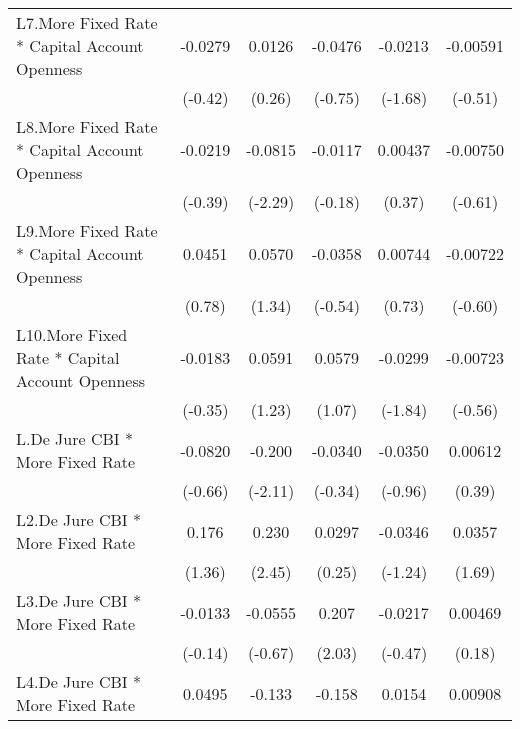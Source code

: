 {\begin{longtable}{l*{5}{c}}
\addlinespace
L7.More Fixed Rate * Capital Account Openness&  -0.0279         &   0.0126         &  -0.0476         &  -0.0213         & -0.00591         \\
                &  (-0.42)         &   (0.26)         &  (-0.75)         &  (-1.68)         &  (-0.51)         \\
\addlinespace
L8.More Fixed Rate * Capital Account Openness&  -0.0219         &  -0.0815\sym{*}  &  -0.0117         &  0.00437         & -0.00750         \\
                &  (-0.39)         &  (-2.29)         &  (-0.18)         &   (0.37)         &  (-0.61)         \\
\addlinespace
L9.More Fixed Rate * Capital Account Openness&   0.0451         &   0.0570         &  -0.0358         &  0.00744         & -0.00722         \\
                &   (0.78)         &   (1.34)         &  (-0.54)         &   (0.73)         &  (-0.60)         \\
\addlinespace
L10.More Fixed Rate * Capital Account Openness&  -0.0183         &   0.0591         &   0.0579         &  -0.0299         & -0.00723         \\
                &  (-0.35)         &   (1.23)         &   (1.07)         &  (-1.84)         &  (-0.56)         \\
\addlinespace
L.De Jure CBI * More Fixed Rate&  -0.0820         &   -0.200\sym{*}  &  -0.0340         &  -0.0350         &  0.00612         \\
                &  (-0.66)         &  (-2.11)         &  (-0.34)         &  (-0.96)         &   (0.39)         \\
\addlinespace
L2.De Jure CBI * More Fixed Rate&    0.176         &    0.230\sym{*}  &   0.0297         &  -0.0346         &   0.0357         \\
                &   (1.36)         &   (2.45)         &   (0.25)         &  (-1.24)         &   (1.69)         \\
\addlinespace
L3.De Jure CBI * More Fixed Rate&  -0.0133         &  -0.0555         &    0.207\sym{*}  &  -0.0217         &  0.00469         \\
                &  (-0.14)         &  (-0.67)         &   (2.03)         &  (-0.47)         &   (0.18)         \\
\addlinespace
L4.De Jure CBI * More Fixed Rate&   0.0495         &   -0.133         &   -0.158         &   0.0154         &  0.00908         \\

\end{longtable}}
